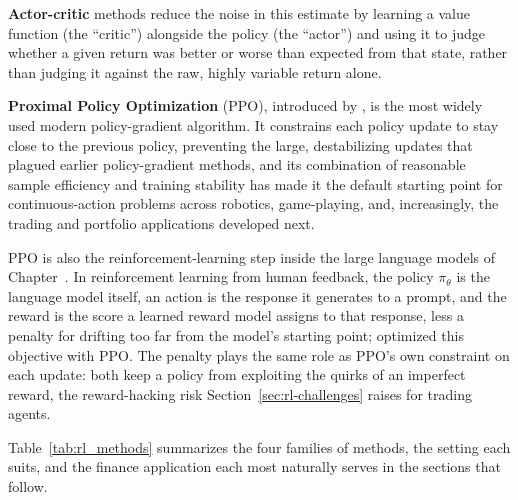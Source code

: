 \documentclass[../ai_in_finance]{subfiles}
\begin{document}
\textbf{Actor-critic} methods reduce the noise in this estimate by learning a value function (the ``critic'') alongside the policy (the ``actor'') and using it to judge whether a given return was better or worse than expected from that state, rather than judging it against the raw, highly variable return alone.

\textbf{Proximal Policy Optimization} (PPO), introduced by \textcite{schulman2017proximal}, is the most widely used modern policy-gradient algorithm. It constrains each policy update to stay close to the previous policy, preventing the large, destabilizing updates that plagued earlier policy-gradient methods, and its combination of reasonable sample efficiency and training stability has made it the default starting point for continuous-action problems across robotics, game-playing, and, increasingly, the trading and portfolio applications developed next.

PPO is also the reinforcement-learning step inside the large language models of Chapter~. In reinforcement learning from human feedback, the policy $\pi_\theta$ is the language model itself, an action is the response it generates to a prompt, and the reward is the score a learned reward model assigns to that response, less a penalty for drifting too far from the model's starting point; \textcite{ouyang2022training} optimized this objective with PPO. The penalty plays the same role as PPO's own constraint on each update: both keep a policy from exploiting the quirks of an imperfect reward, the reward-hacking risk Section~\ref{sec:rl-challenges} raises for trading agents.

Table~\ref{tab:rl_methods} summarizes the four families of methods, the setting each suits, and the finance application each most naturally serves in the sections that follow.
\end{document}
